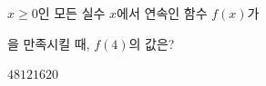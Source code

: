 $x\ge 0$인 모든 실수 $x$에서 연속인 함수 $f(x)$가 \par\smallskip{}\par\smallskip\noindent 을 만족시킬 때, $f(4)$의 값은?
\begin{choices32}{$4$}{$8$}{$12$}{$16$}{$20$}\end{choices32}
